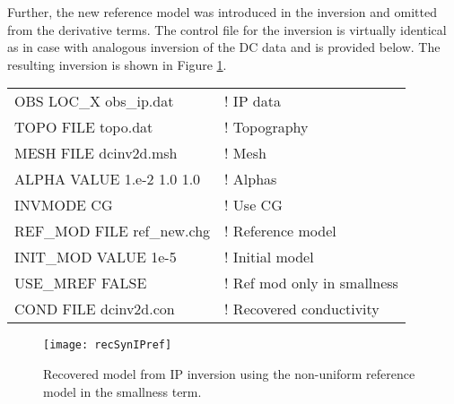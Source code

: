Further, the new reference model was introduced in the inversion and omitted from the derivative terms. The control file for the inversion is virtually identical as in case with analogous inversion of the DC data and is provided below. The resulting inversion is shown in Figure \ref{fig:recSynIPref}.
%
\begin{fileExample}
\begin{tabular}{|ll|}
\hline
OBS LOC\_X obs\_ip.dat & ! IP data \\
TOPO FILE topo.dat & ! Topography\\
MESH FILE dcinv2d.msh & ! Mesh \\
ALPHA VALUE 1.e-2 1.0 1.0 & ! Alphas \\
INVMODE CG & ! Use CG \\
REF\_MOD FILE ref\_new.chg & ! Reference model \\
INIT\_MOD VALUE 1e-5 & ! Initial model \\
USE\_MREF FALSE & ! Ref mod only in smallness \\
COND FILE dcinv2d.con & ! Recovered conductivity \\
\hline
\end{tabular}
\end{fileExample}
%
\begin{figure}
\centering
\texttt{[image: recSynIPref]}
\caption{Recovered model from IP inversion using the non-uniform reference model in the smallness term.}
\label{fig:recSynIPref}
\end{figure}

